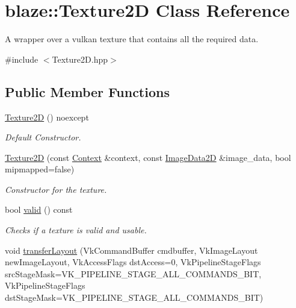 \hypertarget{classblaze_1_1Texture2D}{}\section{blaze\+:\+:Texture2D Class Reference}
\label{classblaze_1_1Texture2D}


A wrapper over a vulkan texture that contains all the required data.  




{\ttfamily \#include $<$Texture2\+D.\+hpp$>$}

\subsection*{Public Member Functions}
\begin{DoxyCompactItemize}
\item 
\mbox{\label{classblaze_1_1Texture2D_ac2c630eccb2ac79ee331e03980622cc3}} 
\hyperlink{classblaze_1_1Texture2D_ac2c630eccb2ac79ee331e03980622cc3}{Texture2D} () noexcept
\begin{DoxyCompactList}\small\item\em Default Constructor. \end{DoxyCompactList}\item 
\hyperlink{classblaze_1_1Texture2D_abf1fad7d391f59d068c13683c3fe014a}{Texture2D} (const \hyperlink{classblaze_1_1Context}{Context} \&context, const \hyperlink{structblaze_1_1ImageData2D}{Image\+Data2D} \&image\+\_\+data, bool mipmapped=false)
\begin{DoxyCompactList}\small\item\em Constructor for the texture. \end{DoxyCompactList}\item 
bool \hyperlink{classblaze_1_1Texture2D_af8ce33dec5506e1f52df11f7aef8c9fc}{valid} () const
\begin{DoxyCompactList}\small\item\em Checks if a texture is valid and usable. \end{DoxyCompactList}\item 
void \hyperlink{classblaze_1_1Texture2D_a14cd835af0b1c5e137f10dbb7b968e83}{transfer\+Layout} (Vk\+Command\+Buffer cmdbuffer, Vk\+Image\+Layout new\+Image\+Layout, Vk\+Access\+Flags dst\+Access=0, Vk\+Pipeline\+Stage\+Flags src\+Stage\+Mask=V\+K\+\_\+\+P\+I\+P\+E\+L\+I\+N\+E\+\_\+\+S\+T\+A\+G\+E\+\_\+\+A\+L\+L\+\_\+\+C\+O\+M\+M\+A\+N\+D\+S\+\_\+\+B\+IT, Vk\+Pipeline\+Stage\+Flags dst\+Stage\+Mask=V\+K\+\_\+\+P\+I\+P\+E\+L\+I\+N\+E\+\_\+\+S\+T\+A\+G\+E\+\_\+\+A\+L\+L\+\_\+\+C\+O\+M\+M\+A\+N\+D\+S\+\_\+\+B\+IT)

\end{DoxyCompactItemize}
